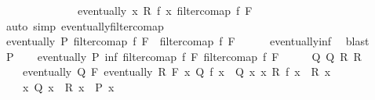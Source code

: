 \begin{isabellebody}
\ \ \ \ \ \ \ \ \ \ \ \ \ \ {\isachardoublequoteopen}eventually\ {\isacharparenleft}{\kern0pt}{\isasymlambda}x{\isachardot}{\kern0pt}\ R\ {\isacharparenleft}{\kern0pt}f\ x{\isacharparenright}{\kern0pt}{\isacharparenright}{\kern0pt}\ {\isacharparenleft}{\kern0pt}filtercomap\ f\ F{}{\isacharparenright}{\kern0pt}{\isachardoublequoteclose}\isanewline
\ \ \ \ \isamarkupfalse%
\ {\isacharparenleft}{\kern0pt}auto\ simp{\isacharcolon}{\kern0pt}\ eventually{\isacharunderscore}{\kern0pt}filtercomap{\isacharparenright}{\kern0pt}\isanewline
\ \ \isamarkupfalse%
\ {\isacharasterisk}{\kern0pt}\ \isamarkupfalse%
\ {\isachardoublequoteopen}eventually\ P\ {\isacharparenleft}{\kern0pt}filtercomap\ f\ F{}\ {\isasymsqinter}\ filtercomap\ f\ F{}{\isacharparenright}{\kern0pt}{\isachardoublequoteclose}\isanewline
\ \ \ \ \isamarkupfalse%
\ eventually{\isacharunderscore}{\kern0pt}inf\ \isamarkupfalse%
\ blast\isanewline
{}\isamarkupfalse%
\isanewline
\ \ \isamarkupfalse%
\ P\isanewline
\ \ \isamarkupfalse%
\ {\isachardoublequoteopen}eventually\ P\ {\isacharparenleft}{\kern0pt}inf\ {\isacharparenleft}{\kern0pt}filtercomap\ f\ F{}{\isacharparenright}{\kern0pt}\ {\isacharparenleft}{\kern0pt}filtercomap\ f\ F{}{\isacharparenright}{\kern0pt}{\isacharparenright}{\kern0pt}{\isachardoublequoteclose}\isanewline
\ \ \isamarkupfalse%
\ \isamarkupfalse%
\ Q\ Q{\isacharprime}{\kern0pt}\ R\ R{\isacharprime}{\kern0pt}\ \ {\isacharasterisk}{\kern0pt}{\isacharcolon}{\kern0pt}\isanewline
\ \ \ \ {\isachardoublequoteopen}eventually\ Q\ F{}{\isachardoublequoteclose}\ {\isachardoublequoteopen}eventually\ R\ F{}{\isachardoublequoteclose}\ {\isachardoublequoteopen}{\isasymAnd}x{\isachardot}{\kern0pt}\ Q\ {\isacharparenleft}{\kern0pt}f\ x{\isacharparenright}{\kern0pt}\ {\isasymLongrightarrow}\ Q{\isacharprime}{\kern0pt}\ x{\isachardoublequoteclose}\ {\isachardoublequoteopen}{\isasymAnd}x{\isachardot}{\kern0pt}\ R\ {\isacharparenleft}{\kern0pt}f\ x{\isacharparenright}{\kern0pt}\ {\isasymLongrightarrow}\ R{\isacharprime}{\kern0pt}\ x{\isachardoublequoteclose}\ \isanewline
\ \ \ \ {\isachardoublequoteopen}{\isasymAnd}x{\isachardot}{\kern0pt}\ Q{\isacharprime}{\kern0pt}\ x\ {\isasymLongrightarrow}\ R{\isacharprime}{\kern0pt}\ x\ {\isasymLongrightarrow}\ P\ x{\isachardoublequoteclose}\isanewline
\ \ \ \ \isamarkupfalse%

\end{isabellebody}
